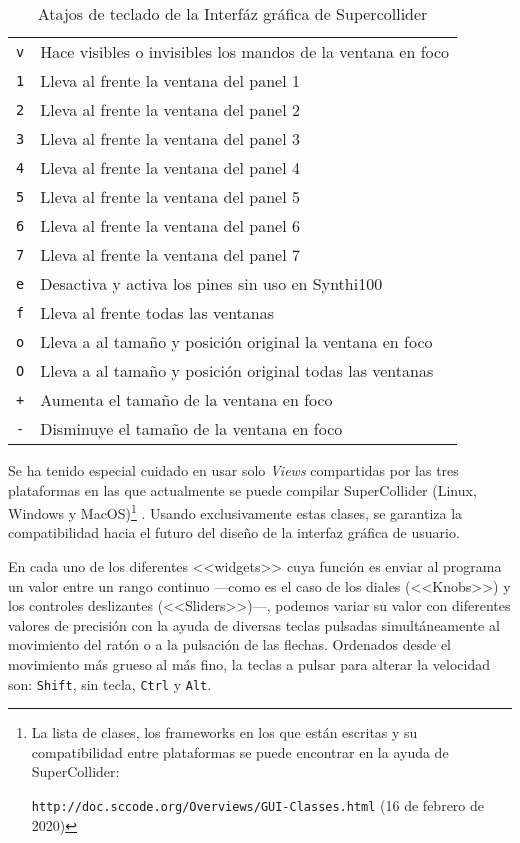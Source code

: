\begin{table}
	\begin{center}
		\begin{tabular}{ |l|l| }
  		\hline
  		\texttt{v} & Hace visibles o invisibles los mandos de la ventana en foco\\
  		\texttt{1} & Lleva al frente la ventana del panel 1\\
  		\texttt{2} & Lleva al frente la ventana del panel 2\\
  		\texttt{3} & Lleva al frente la ventana del panel 3\\
  		\texttt{4} & Lleva al frente la ventana del panel 4\\
  		\texttt{5} & Lleva al frente la ventana del panel 5\\
  		\texttt{6} & Lleva al frente la ventana del panel 6\\
  		\texttt{7} & Lleva al frente la ventana del panel 7\\
  		\texttt{e} & Desactiva y activa los pines sin uso en Synthi100\\
  		\texttt{f} & Lleva al frente todas las ventanas\\
  		\texttt{o} & Lleva a al tamaño y posición original la ventana en foco\\
  		\texttt{O} & Lleva a al tamaño y posición original todas las ventanas\\
  		\texttt{+} & Aumenta el tamaño de la ventana en foco\\
  		\texttt{-} & Disminuye el tamaño de la ventana en foco\\
  		\hline
		\end{tabular}
		\caption[Atajos de teclado]{Atajos de teclado de la Interfáz gráfica de Supercollider}
		\label{table:atajos}
	\end{center}
\end{table}

Se ha tenido especial cuidado en usar solo \textit{Views} compartidas por las tres plataformas en las que actualmente se puede compilar SuperCollider (Linux, Windows y MacOS)\footnote{La lista de clases, los frameworks en los que están escritas y su compatibilidad entre plataformas se puede encontrar en la ayuda de SuperCollider: 

\texttt{http://doc.sccode.org/Overviews/GUI-Classes.html} (16 de febrero de 2020) } . Usando exclusivamente estas clases, se garantiza la compatibilidad hacia el futuro del diseño de la interfaz gráfica de usuario.

En cada uno de los diferentes <<widgets>> cuya función es enviar al programa un valor entre un rango continuo ---como es el caso de los diales (<<Knobs>>) y los controles deslizantes (<<Sliders>>)---, podemos variar su valor con diferentes valores de precisión con la ayuda de diversas teclas pulsadas simultáneamente al movimiento del ratón o a la pulsación de las flechas. Ordenados desde el movimiento más grueso al más fino, la teclas a pulsar para alterar la velocidad son: \texttt{Shift}, sin tecla, \texttt{Ctrl} y \texttt{Alt}.

